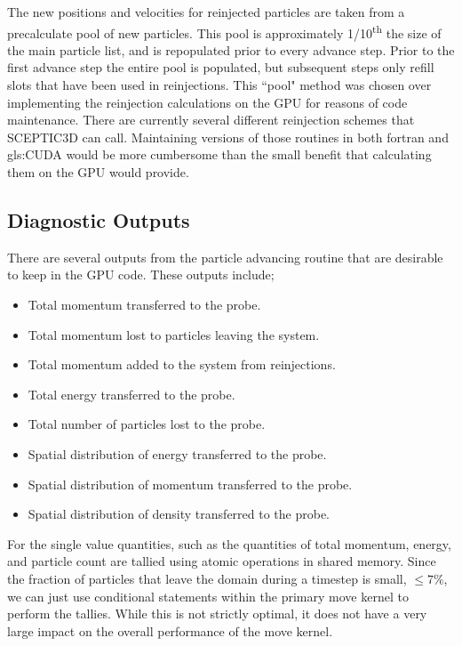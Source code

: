 The new positions and velocities for reinjected particles are taken from a precalculate pool of new particles. This pool is approximately 1/10\textsuperscript{th} the size of the main particle list, and is repopulated prior to every advance step. Prior to the first advance step the entire pool is populated, but subsequent steps only refill slots that have been used in reinjections. This ``pool" method was chosen over implementing the reinjection calculations on the GPU for reasons of code maintenance. There are currently several different reinjection schemes that SCEPTIC3D can call. Maintaining versions of those routines in both fortran and \gls{gls:CUDA} would be more cumbersome than the small benefit that calculating them on the GPU would provide. 

		\subsection{Diagnostic Outputs}
		\label{sec:diagnostic_outputs}
	There are several outputs from the particle advancing routine that are desirable to keep in the GPU code. These outputs include;


\begin{itemize}
\singlespacing
\item Total momentum transferred to the probe.
\item Total momentum lost to particles leaving the system.
\item Total momentum added to the system from reinjections.
\item Total energy transferred to the probe. 
\item Total number of particles lost to the probe. 
\item Spatial distribution of energy transferred to the probe. 
\item Spatial distribution of momentum transferred to the probe. 
\item Spatial distribution of density transferred to the probe. 
\end{itemize}


	For the single value quantities, such as the quantities of total momentum, energy, and particle count are tallied using atomic operations in shared memory. Since the fraction of particles that leave the domain during a timestep is small, $\leq 7\%$, we can just use conditional statements within the primary move kernel to perform the tallies. While this is not strictly optimal, it does not have a very large impact on the overall performance of the move kernel. 






